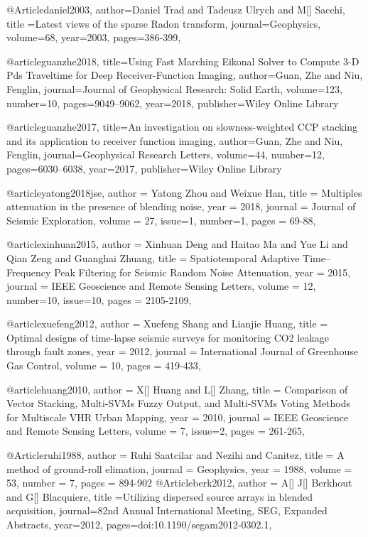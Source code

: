 @Article{daniel2003,
  author={Daniel Trad and Tadeusz Ulrych and M[] Sacchi},
  title ={Latest views of the sparse {R}adon transform},
  journal={Geophysics},
  volume=68,
  year=2003,
  pages={386-399},
}

@article{guanzhe2018,
  title={Using Fast Marching Eikonal Solver to Compute 3-D Pds Traveltime for Deep Receiver-Function Imaging},
  author={Guan, Zhe and Niu, Fenglin},
  journal={Journal of Geophysical Research: Solid Earth},
  volume={123},
  number={10},
  pages={9049--9062},
  year={2018},
  publisher={Wiley Online Library}
}

@article{guanzhe2017,
  title={An investigation on slowness-weighted CCP stacking and its application to receiver function imaging},
  author={Guan, Zhe and Niu, Fenglin},
  journal={Geophysical Research Letters},
  volume={44},
  number={12},
  pages={6030--6038},
  year={2017},
  publisher={Wiley Online Library}
}


@article{yatong2018jse,
  author =	 {Yatong Zhou and Weixue Han},
  title =	 {Multiples attenuation in the presence of blending noise},
  year =	 2018,
  journal =	 {Journal of Seismic Exploration},
  volume =	 27,
  issue=1,
  number=1,
  pages =	 {69-88},
}



@article{xinhuan2015,
  author =	 {Xinhuan Deng and Haitao Ma and Yue Li and Qian Zeng and Guanghai Zhuang},
  title =	 {Spatiotemporal Adaptive Time–Frequency Peak Filtering for Seismic Random Noise Attenuation},
  year =	 2015,
  journal =	 {IEEE Geoscience and Remote Sensing Letters},
  volume =	 12,
  number=10,
  issue=10,
  pages =	 {2105-2109},
}

@article{xuefeng2012,
  author =	 {Xuefeng Shang and Lianjie Huang},
  title =	 {Optimal designs of time-lapse seismic surveys for monitoring CO2 leakage
through fault zones},
  year =	 2012,
  journal =	 {International Journal of Greenhouse Gas Control},
  volume =	 10,
  pages =	 {419-433},
}


@article{huang2010,
  author =	 {X[] Huang and L[] Zhang},
  title =	 {Comparison of Vector Stacking, Multi-SVMs Fuzzy Output, and Multi-SVMs Voting Methods for Multiscale VHR Urban Mapping},
  year =	 2010,
  journal =	 {IEEE Geoscience and Remote Sensing Letters},
  volume =	 7,
  issue=2,
  pages =	 {261-265},
}


@Article{ruhi1988,
  author = 	 {Ruhi Saatcilar and Nezihi and Canitez},
  title = 	 {A method of ground-roll elimation},
  journal = 	 {Geophysics},
  year = 	 1988,
  volume = 	 53,
  number = 	 7,
  pages = 	 {894-902}}
@Article{berk2012,
  author = {A[] J[] Berkhout and G[] Blacquiere},
  title ={Utilizing dispersed source arrays in blended acquisition},
  journal={82nd Annual International Meeting, SEG, Expanded Abstracts},
  year=2012,
  pages={doi:10.1190/segam2012-0302.1},
}



